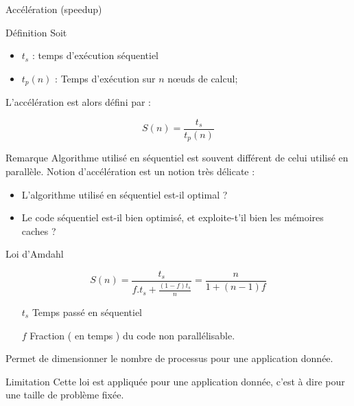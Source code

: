 \documentclass[handout]{beamer}
\begin{document}
\begin{frame}[fragile]{Accélération (speedup)}

\begin{block}{Définition}
Soit
\begin{itemize}
\item $t_{s}$ : temps d'exécution séquentiel
\item $t_{p}(n)$ : Temps d'exécution sur $n$ n{\oe}uds de calcul;
\end{itemize}

L'accélération est alors défini par :

\begin{equation}
 S(n) = \frac{t_{s}}{t_{p}(n)}
\end{equation}
\end{block}

\begin{alertblock}{Remarque}
Algorithme utilisé en séquentiel est souvent différent de celui utilisé
en parallèle. Notion d'accélération est un notion très délicate : 
\begin{itemize}
 \item L'algorithme utilisé en séquentiel est-il optimal ? 
 \item Le code séquentiel est-il bien optimisé, et exploite-t'il bien les mémoires caches ?
\end{itemize}
\end{alertblock}

\end{frame}

\begin{frame}[fragile]{Loi d'Amdahl}

\begin{equation}
 S(n) = \frac{t_{s}}{f.t_{s}+\frac{(1-f)t_{s}}{n}} = \frac{n}{1+(n-1)f}
\end{equation}

\begin{itemize}
\item[$t_{s}$] Temps passé en séquentiel
\item[$f$] Fraction ( en temps ) du code non parallélisable. 
\end{itemize}

Permet de dimensionner le nombre de processus pour une application donnée.

\begin{alertblock}{Limitation}
Cette loi est appliquée pour une application donnée, c'est à dire pour une taille
de problème fixée.
\end{alertblock}
\end{frame}
\end{document}
